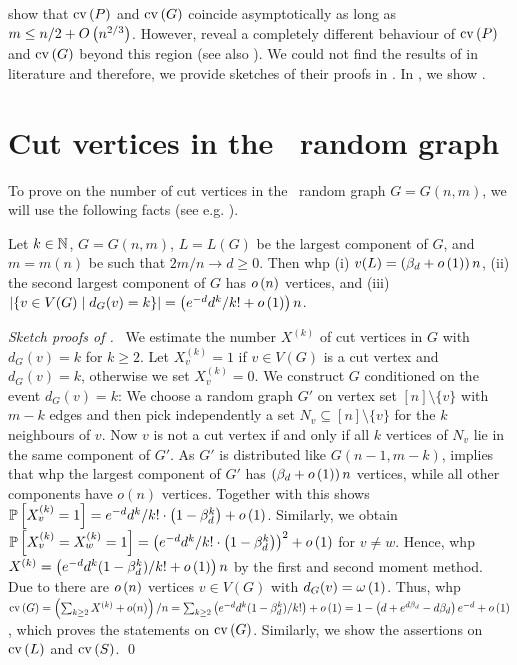  show that $\operatorname{cv}\left(P\right)$ and $\operatorname{cv}\left(G\right)$ coincide asymptotically as long as $m\leq n/2+O\left(n^{2/3}\right)$. However,  reveal a completely different behaviour of $\operatorname{cv}\left(P\right)$ and $\operatorname{cv}\left(G\right)$ beyond this region (see also ). We could not find the results of  in literature and therefore, we provide sketches of their proofs in . In , we show . 
	
\section{Cut vertices in the \ER\ random graph}\label{sec:er}
To prove  on the number of cut vertices in the \ER\ random graph $G=G(n,m)$, we will use the following facts (see e.g. \cite{Bollobas2001}).
\begin{thm}\label{thm:er}
Let $k\in \mathbb{N}$, $G=G(n,m)$, $L=L(G)$ be the largest component of $G$, and $m=m(n)$ be such that $2m/n \to d\geq 0$. Then whp \textup{(i)} $v(L)=\left(\beta_d+o\left(1\right)\right)n$, \textup{(ii)} the second largest component of $G$ has $o\left(n\right)$ vertices, and \textup{(iii)} $\left|\left\{v\in V(G)\mid d_G(v)=k\right\}\right|=\left(e^{-d}d^k/k!+o\left(1\right)\right) n$.
\end{thm}
{\itshape Sketch proofs of .}~
We estimate the number $X^{(k)}$ of cut vertices in $G$ with $d_G(v)=k$ for $k\geq 2$. Let $X_v^{(k)}=1$ if $v\in V(G)$ is a cut vertex and $d_G(v)=k$, otherwise we set $X_v^{(k)}=0$. We construct $G$ conditioned on the event $d_G(v)=k$: We choose a random graph $G'$ on vertex set $[n]\setminus\{v\}$ with $m-k$ edges and then pick independently a set $N_v\subseteq [n]\setminus\{v\}$ for the $k$ neighbours of $v$. Now $v$ is not a cut vertex if and only if all $k$ vertices of $N_v$ lie in the same component of $G'$. As $G'$ is distributed like $G(n-1,m-k)$,  implies that whp the largest component of $G'$ has $\left(\beta_d+o\left(1\right)\right)n$ vertices, while all other components have $o(n)$ vertices. Together with  this shows $\mathbb{P}\left[X_v^{(k)}=1\right]=e^{-d}d^k/k! \cdot \left(1-\beta_d^k\right)+o\left(1\right)$. Similarly, we obtain $\mathbb{P}\left[X_v^{(k)}=X_w^{(k)}=1\right]=\left(e^{-d}d^k/k! \cdot \left(1-\beta_d^k\right)\right)^2+o\left(1\right)$ for $v\neq w$. Hence, whp $X^{(k)}=\left(e^{-d}d^k(1-\beta_d^k)/k!+o\left(1\right)\right)n$ by the first and second moment method. Due to  there are $o\left(n\right)$ vertices $v\in V(G)$ with $d_G(v)=\omega\left(1\right)$. Thus, whp $ \operatorname{cv}\left(G\right)=\left(\sum_{k\geq 2}X^{(k)}  + o(n)\right)/n=\sum_{k\geq 2}\left(e^{-d}d^k(1-\beta_d^k)/k!\right)+o\left(1\right)=1-\left(d+e^{d\beta_d}-d\beta_d\right)e^{-d}+o\left(1\right)$, which proves the statements on $\operatorname{cv}\left(G\right)$. Similarly, we show the assertions on $\operatorname{cv}\left(L\right)$ and $\operatorname{cv}\left(S\right)$. \qed

